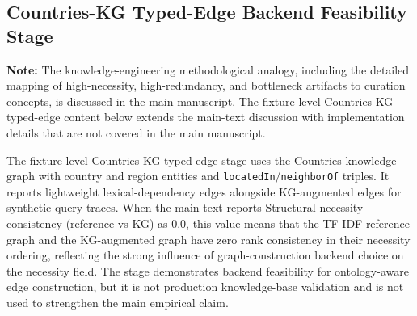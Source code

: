 \documentclass[pdflatex,sn-mathphys-num]{sn-jnl}
\begin{document}
\subsection{Countries-KG Typed-Edge Backend Feasibility Stage}
\label{app:kg-representation-stage}

\noindent\textbf{Note:} The knowledge-engineering methodological analogy, including the detailed mapping of high-necessity, high-redundancy, and bottleneck artifacts to curation concepts, is discussed in the main manuscript. The fixture-level Countries-KG typed-edge content below extends the main-text discussion with implementation details that are not covered in the main manuscript.

The fixture-level Countries-KG typed-edge stage uses the Countries knowledge graph with country and region entities and \texttt{locatedIn}/\texttt{neighborOf} triples. It reports lightweight lexical-dependency edges alongside KG-augmented edges for synthetic query traces. When the main text reports Structural-necessity consistency (reference vs KG) as 0.0, this value means that the TF-IDF reference graph and the KG-augmented graph have zero rank consistency in their necessity ordering, reflecting the strong influence of graph-construction backend choice on the necessity field. The stage demonstrates backend feasibility for ontology-aware edge construction, but it is not production knowledge-base validation and is not used to strengthen the main empirical claim.
\end{document}
